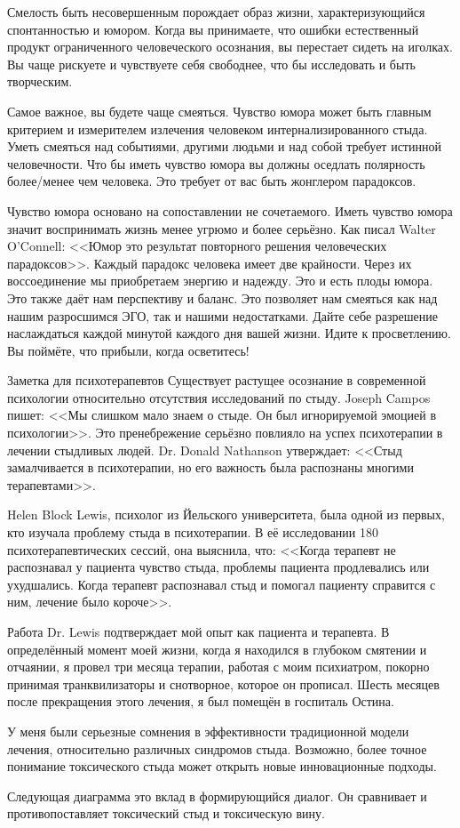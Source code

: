 \documentclass[10pt, fleqn]{article}
\begin{document}
Смелость быть несовершенным порождает образ жизни, характеризующийся спонтанностью и юмором. Когда вы принимаете, что ошибки естественный продукт ограниченного человеческого осознания, вы перестает сидеть на иголках. Вы чаще рискуете и чувствуете себя свободнее, что бы исследовать и быть творческим.

Самое важное, вы будете чаще смеяться. Чувство юмора может быть главным критерием и измерителем излечения человеком интернализированного стыда. Уметь смеяться над событиями, другими людьми и над собой требует истинной человечности. Что бы иметь чувство юмора вы должны оседлать полярность более/менее чем человека. Это требует от вас быть жонглером парадоксов.

Чувство юмора основано на сопоставлении не сочетаемого. Иметь чувство юмора значит воспринимать жизнь менее угрюмо и более серьёзно. Как писал Walter O'Connell: <<Юмор это результат повторного решения человеческих парадоксов>>. Каждый парадокс человека имеет две крайности. Через их воссоединение мы приобретаем энергию и надежду. Это и есть плоды юмора. Это также даёт нам перспективу и баланс. Это позволяет нам смеяться как над нашим разросшимся ЭГО, так и нашими недостатками. Дайте себе разрешение наслаждаться каждой минутой каждого дня вашей жизни. Идите к просветлению. Вы поймёте, что прибыли, когда осветитесь!

Заметка для психотерапевтов
Существует растущее осознание в современной психологии относительно отсутствия исследований по стыду. Joseph Campos пишет: <<Мы слишком мало знаем о стыде. Он был игнорируемой эмоцией в психологии>>. Это пренебрежение серьёзно повлияло на успех психотерапии в лечении стыдливых людей. Dr. Donald Nathanson утверждает: <<Стыд замалчивается в психотерапии, но его важность была распознаны многими терапевтами>>.

Helen Block Lewis, психолог из Йельского университета, была одной из первых, кто изучала проблему стыда в психотерапии. В её исследовании 180 психотерапевтических сессий, она выяснила, что: <<Когда терапевт не распознавал у пациента чувство стыда, проблемы пациента продлевались или ухудшались. Когда терапевт распознавал стыд и помогал пациенту справится с ним, лечение было короче>>.

Работа Dr. Lewis подтверждает мой опыт как пациента и терапевта. В определённый момент моей жизни, когда я находился в глубоком смятении и отчаянии, я провел три месяца терапии, работая с моим психиатром, покорно принимая транквилизаторы и снотворное, которое он прописал. Шесть месяцев после прекращения этого лечения, я был помещён в госпиталь Остина.

У меня были серьезные сомнения в эффективности традиционной модели лечения, относительно различных синдромов стыда. Возможно, более точное понимание токсического стыда может открыть новые инновационные подходы.

Следующая диаграмма это вклад в формирующийся диалог. Он сравнивает и противопоставляет токсический стыд и токсическую вину.
\end{document}
